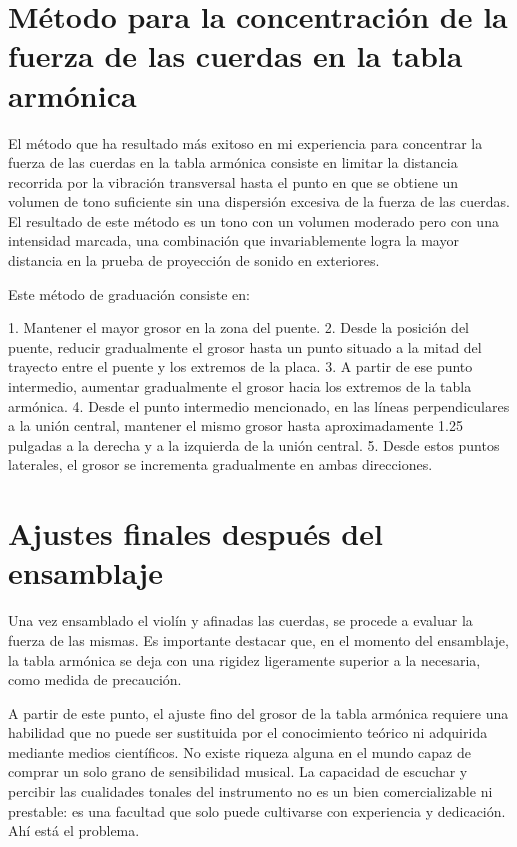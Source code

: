 \documentclass[12pt]{book}
\begin{document}
\section*{Método para la concentración de la fuerza de las cuerdas en la tabla armónica}

El método que ha resultado más exitoso en mi experiencia para concentrar la fuerza de las cuerdas en la tabla armónica consiste en limitar la distancia recorrida por la vibración transversal hasta el punto en que se obtiene un volumen de tono suficiente sin una dispersión excesiva de la fuerza de las cuerdas. El resultado de este método es un tono con un volumen moderado pero con una intensidad marcada, una combinación que invariablemente logra la mayor distancia en la prueba de proyección de sonido en exteriores.

Este método de graduación consiste en:  

1. Mantener el mayor grosor en la zona del puente.  
2. Desde la posición del puente, reducir gradualmente el grosor hasta un punto situado a la mitad del trayecto entre el puente y los extremos de la placa.  
3. A partir de ese punto intermedio, aumentar gradualmente el grosor hacia los extremos de la tabla armónica.  
4. Desde el punto intermedio mencionado, en las líneas perpendiculares a la unión central, mantener el mismo grosor hasta aproximadamente 1.25 pulgadas a la derecha y a la izquierda de la unión central.  
5. Desde estos puntos laterales, el grosor se incrementa gradualmente en ambas direcciones.

\section*{Ajustes finales después del ensamblaje}

Una vez ensamblado el violín y afinadas las cuerdas, se procede a evaluar la fuerza de las mismas. Es importante destacar que, en el momento del ensamblaje, la tabla armónica se deja con una rigidez ligeramente superior a la necesaria, como medida de precaución.

A partir de este punto, el ajuste fino del grosor de la tabla armónica requiere una habilidad que no puede ser sustituida por el conocimiento teórico ni adquirida mediante medios científicos. No existe riqueza alguna en el mundo capaz de comprar un solo grano de sensibilidad musical. La capacidad de escuchar y percibir las cualidades tonales del instrumento no es un bien comercializable ni prestable: es una facultad que solo puede cultivarse con experiencia y dedicación.
Ahí está el problema.
\end{document}
